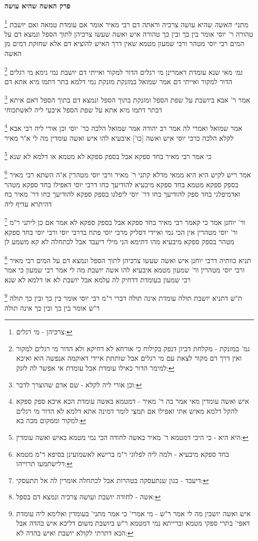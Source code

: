 \documentclass[12pt, openany]{book}
\newcommand{\sethebfont}{
\fontsize{10.5pt}{21.0pt} \selectfont
}
\newcommand{\twocol}[1]{
	{\sethebfont \begin{multicols}{2}
			#1
	\end{multicols}}	
}
\newcommand{\chapname}{}
\newcommand{\newchap}[1]{
	\addcontentsline{toc}{chapter}{#1}
	\renewcommand{\chapname}{#1}
		\begin{center}
			\textbf{%
\fontsize{16pt}{16pt}\selectfont
				#1}
		\end{center}
}
\newcommand{\footnotecomment}[1]{
	\renewcommand\thefootnote{}
	\footnote{#1}}
\newcommand{\commenta}[1]{\footnotecomment{#1}}
\begin{document}
{\newchap{פרק  האשה שהיא עושה}
\twocol{
\commenta{צרכיהן - מי רגלים:}
מתני׳ {\large\emph{האשה}} שהיא עושה צרכיה וראתה דם רבי מאיר אומר אם עומדת טמאה ואם יושבת טהורה ר' יוסי אומר בין כך ובין כך טהורה 
איש ואשה שעשו צרכיהן לתוך הספל ונמצא דם על המים רבי יוסי מטהר ורבי שמעון מטמא שאין דרך האיש להוציא דם אלא שחזקת דמים מן האשה
\commenta{גמ' במזנקת - מקלחת דכיון דנפק בקילוח כי אורחא לא דחיקא ולא הדור מי רגלים למקור ואין דרך דם מקור לצאת עם מי רגלים אבל שותתת איידי דאוקמה אנפשה הוא ואיכא למימר הדור כאילו עומדת אבל עומדת אי אפשר לה לזנק:}
{\large\emph{גמ׳}} מאי שנא עומדת דאמרינן מי רגלים הדור למקור ואייתי דם יושבת נמי נימא מי רגלים הדור למקור ואייתי דם
אמר שמואל במזנקת מזנקת נמי דלמא בתר דתמו מיא אתא דם 
\commenta{וכן אורי ליה לקלא - שם אדם שהוצרך לדבר:}
אמר ר' אבא ביושבת על שפת הספל ומזנקת בתוך הספל ונמצא דם בתוך הספל דאם איתא דבתר דתמו מיא אתא על שפת הספל איבעי ליה לאשתכוחי 
\commenta{איש ואשה עומדין מאי אמר בה ר' מאיר - דמטמא באשה עומדת הכא איכא ספק ספקא להקל דלמא מאיש אתי ואפילו אם תמצי לומר דמינה אתא דלמא לא הדור מי רגלים למקור וממקום מכה בא:}
אמר שמואל ואמרי לה אמר רב יהודה אמר שמואל הלכה כר' יוסי וכן אורי ליה רבי אבא לקלא הלכה כרבי יוסי
איש ואשה [כו'] איבעיא להו איש ואשה עומדין מה לי א"ר מאיר 
\commenta{היא היא - כי היכי דמטמא ר' מאיר באשה לחודה הכי נמי מטמא באיש ואשה עומדין:}
כי אמר רבי מאיר בחד ספקא אבל בספק ספקא לא מטמא או דלמא לא שנא 
\commenta{בחד ספקא מיבעיא - ולמה ליה לפלוגי ר"מ ברישא לאשמועינן בסיפא ר"מ מטמא דלישתמעו תרוייהו:}
אמר ריש לקיש היא היא ממאי מדלא קתני ר' מאיר ורבי יוסי מטהרין 
א"ה השתא רבי מאיר בספק ספקא מטמא בחד ספקא מיבעיא להודיעך כחו דרבי יוסי דאפילו בחד ספקא מטהר 
ואדמיפלגי בחד ספק להודיעך כחו דר' יוסי ליפלגו בספק ספקא להודיעך כחו דר' מאיר כח דהיתרא עדיף ליה 
\commenta{דיעבד - כגון שנתעסקה בטהרות אבל לכתחלה אומרין לה אל תתעסקי:}
ור' יוחנן אמר כי קאמר רבי מאיר בחד ספקא אבל בספק ספקא לא אמר אם כן ליתני ר"מ ור' יוסי מטהרין אין הכי נמי ואיידי דסליק מרבי יוסי פתח בדרבי יוסי 
ורבי יוסי בחד ספקא מטהר בספק ספקא מיבעיא מהו דתימא הני מילי דיעבד אבל לכתחלה לא קא משמע לן 
\commenta{אשה - לחודה יושבת ועושה צרכיה ונמצא דם בספל:}
תניא כוותיה דרבי יוחנן איש ואשה שעשו צרכיהן לתוך הספל ונמצא דם על המים רבי מאיר ורבי יוסי מטהרין ור' שמעון מטמא 
איבעיא להו אשה יושבת מה לי אמר רבי שמעון כי אמר רבי שמעון בעומדת דדחיק לה עלמא אבל יושבת לא או דלמא לא שנא 
\commenta{איש ואשה יושבין מה לי אמר ר"ש - מי אמרי' כי אמר מתני' בעומדין ואלימא ליה עומדת דאפי' בתרי ספקי מטמא וברייתא נמי דמטמא ר"ש ביושבת משום דליכא איש בהדה אבל הכא דתרתי לקולא יושבת ואיש בהדה לא:}
ת"ש דתניא יושבת תולה עומדת אינה תולה דברי ר"מ רבי יוסי אומר בין כך ובין כך תולה ר"ש אומר בין כך ובין כך אינה תולה 
}}
\end{document}
